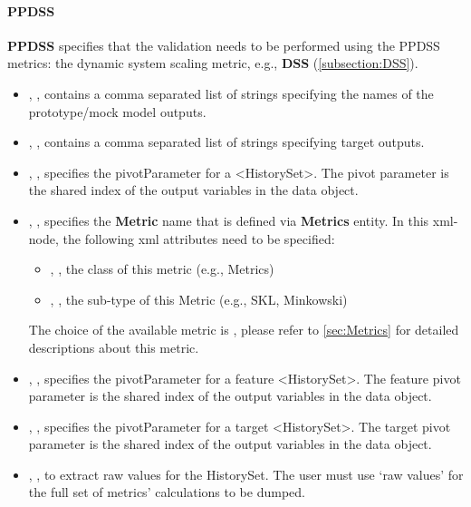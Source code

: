 \paragraph{PPDSS}
\textbf{PPDSS} specifies that the validation needs to be performed
using the PPDSS metrics: the dynamic system scaling metric, e.g., \textbf{DSS} (\ref{subsection:DSS}).

%
%

\begin{itemize}
  \item {}, , contains a comma separated list of strings specifying the names of the prototype/mock model outputs.
  \item {}, , contains a comma separated list of
   strings specifying target outputs.
  \item {}, , specifies the pivotParameter for a <HistorySet>.
    The pivot parameter is the shared index of the output variables in the data object.
  \item {}, , specifies the \textbf{Metric} name that is defined via
    \textbf{Metrics} entity. In this xml-node, the following xml attributes need to be specified:
    \begin{itemize}
      \item {}, , the class of this metric (e.g., Metrics)
      \item {}, , the sub-type of this Metric (e.g., SKL, Minkowski)
    \end{itemize}
    \nb The choice of the available metric is , please
    refer to \ref{sec:Metrics} for detailed descriptions about this metric.
    \item {}, , specifies the pivotParameter for a feature <HistorySet>. The feature pivot parameter is the shared index of the output variables in the data object.
    \item {}, , specifies the pivotParameter for a target <HistorySet>. The target pivot parameter is the shared index of the output variables in the data object.
    \item {}, , to extract raw values for the HistorySet. The user must use ‘raw values’ for the full set of metrics’ calculations to be dumped.

\end{itemize}
